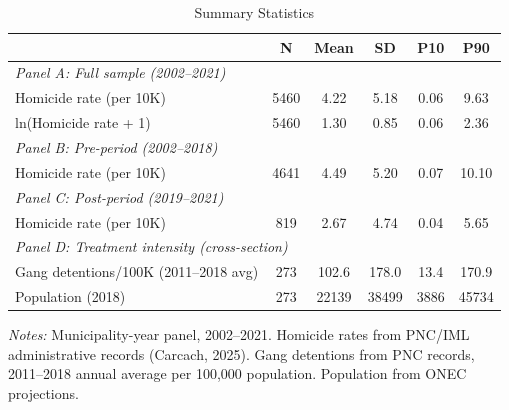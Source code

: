 \begin{table}[htbp]
\centering
\caption{Summary Statistics}
\label{tab:summary}
\begin{tabular}{lccccc}
\toprule
 & N & Mean & SD & P10 & P90 \\
\midrule
\multicolumn{6}{l}{\textit{Panel A: Full sample (2002--2021)}} \\[3pt]
Homicide rate (per 10K) & 5460 & 4.22 & 5.18 & 0.06 & 9.63 \\
ln(Homicide rate + 1) & 5460 & 1.30 & 0.85 & 0.06 & 2.36 \\
\midrule
\multicolumn{6}{l}{\textit{Panel B: Pre-period (2002--2018)}} \\[3pt]
Homicide rate (per 10K) & 4641 & 4.49 & 5.20 & 0.07 & 10.10 \\
\midrule
\multicolumn{6}{l}{\textit{Panel C: Post-period (2019--2021)}} \\[3pt]
Homicide rate (per 10K) & 819 & 2.67 & 4.74 & 0.04 & 5.65 \\
\midrule
\multicolumn{6}{l}{\textit{Panel D: Treatment intensity (cross-section)}} \\[3pt]
Gang detentions/100K (2011--2018 avg) & 273 & 102.6 & 178.0 & 13.4 & 170.9 \\
Population (2018) & 273 & 22139 & 38499 & 3886 & 45734 \\
\bottomrule
\end{tabular}
\begin{tablenotes}[flushleft]\small
\item \textit{Notes:} Municipality-year panel, 2002--2021. Homicide rates from PNC/IML administrative records (Carcach, 2025). Gang detentions from PNC records, 2011--2018 annual average per 100,000 population. Population from ONEC projections.
\end{tablenotes}
\end{table}
